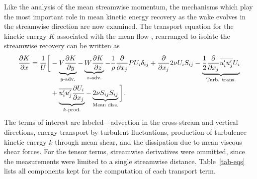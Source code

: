 Like the analysis of the mean streamwise momentum, the mechanisms which play the
most important role in mean kinetic energy recovery as the wake evolves in the
streamwise direction are now examined. The transport equation for the kinetic
energy $K$ associated with the mean flow \cite{TennekesAndLumley}, rearranged to
isolate the streamwise recovery can be written as
\begin{equation}
    \begin{split}
        \frac{\partial K}{\partial x}
        =
        \frac{1}{U}
        \bigg{[}
        & - \underbrace{V \frac{\partial K}{\partial y}}_{y\text{-adv.}}
        - \underbrace{W \frac{\partial K}{\partial z}}_{z\text{-adv.}}
        - \frac{1}{\rho}\frac{\partial}{\partial x_j} P U_i \delta_{ij}
        + \frac{\partial}{\partial x_j} 2 \nu U_i S_{ij}
        - \underbrace{
            \frac{1}{2}\frac{\partial}{\partial x_j} \overline{u_i' u_j'} U_i
        }_{\text{Turb. trans.}} \\
        & + 
        \underbrace{
            \overline{u_i' u_j'} \frac{\partial U_i}{\partial x_j}
        }_{k\text{-prod.}}
        - 
        \underbrace{
            2 \nu S_{ij}S_{ij}
        }_{\text{Mean diss.}}
        \bigg{]}.
    \label{eq-K_full}
    \end{split}
\end{equation}
The terms of interest are labeled---advection in the cross-stream and vertical
directions, energy transport by turbulent fluctuations, production of turbulence
kinetic energy $k$ through mean shear, and the dissipation due to mean viscous
shear forces. For the tensor terms, streamwise derivatives were ommitted, since
the measurements were limited to a single streamwise distance.
Table~\ref{tab-eqs} lists all components kept for the computation of each
transport term.

